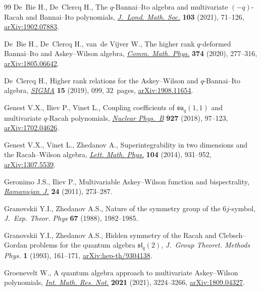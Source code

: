 \begin{thebibliography}{99}
De~Bie H., De~Clercq H., The {$q$}-{B}annai--{I}to algebra and multivariate
 {$(-q)$}-{R}acah and {B}annai--{I}to polynomials, \href{https://doi.org/10.1112/jlms.12367}{\textit{J.~Lond. Math.
 Soc.}} \textbf{103} (2021), 71--126, \href{https://arxiv.org/abs/1902.07883}{arXiv:1902.07883}.

De~Bie H., De~Clercq H., van~de Vijver W., The higher rank {$q$}-deformed
 {B}annai--{I}to and {A}skey--{W}ilson algebra, \href{https://doi.org/10.1007/s00220-019-03562-w}{\textit{Comm. Math. Phys.}}
 \textbf{374} (2020), 277--316, \href{https://arxiv.org/abs/1805.06642}{arXiv:1805.06642}.

De~Clercq H., Higher rank relations for the {A}skey--{W}ilson and
 {$q$}-{B}annai--{I}to algebra, \href{https://doi.org/10.3842/SIGMA.2019.099}{\textit{SIGMA}} \textbf{15} (2019), 099,
 32~pages, \href{https://arxiv.org/abs/1908.11654}{arXiv:1908.11654}.

Genest V.X., Iliev P., Vinet L., Coupling coefficients of
 {$\mathfrak{su}_q(1,1)$} and multivariate {$q$}-{R}acah polynomials,
 \href{https://doi.org/10.1016/j.nuclphysb.2017.12.009}{\textit{Nuclear Phys.~B}} \textbf{927} (2018), 97--123, \href{https://arxiv.org/abs/1702.04626}{arXiv:1702.04626}.

Genest V.X., Vinet L., Zhedanov A., Superintegrability in two dimensions and
 the {R}acah--{W}ilson algebra, \href{https://doi.org/10.1007/s11005-014-0697-y}{\textit{Lett. Math. Phys.}} \textbf{104}
 (2014), 931--952, \href{https://arxiv.org/abs/1307.5539}{arXiv:1307.5539}.

Geronimo J.S., Iliev P., Multivariable {A}skey--{W}ilson function and
 bispectrality, \href{https://doi.org/10.1007/s11139-010-9244-3}{\textit{Ramanujan~J.}} \textbf{24} (2011), 273--287.

Granovskii Y.I., Zhedanov A.S., Nature of the symmetry group of the
 {$6j$}-symbol, \textit{J.~Exp. Theor. Phys} \textbf{67} (1988), 1982--1985.

Granovskii Y.I., Zhedanov A.S., Hidden symmetry of the {R}acah and
 {C}lebsch--{G}ordan problems for the quantum algebra $\mathfrak{sl}_q(2)$,
 \textit{J.~Group Theoret. Methods Phys.} \textbf{1} (1993), 161--171,
 \href{https://arxiv.org/abs/hep-th/9304138}{arXiv:hep-th/9304138}.

Groenevelt W., A quantum algebra approach to multivariate {A}skey--{W}ilson
 polynomials, \href{https://doi.org/10.1093/imrn/rnz182}{\textit{Int. Math. Res. Not.}} \textbf{2021} (2021), 3224--3266,
 \href{https://arxiv.org/abs/1809.04327}{arXiv:1809.04327}.


\end{thebibliography}
